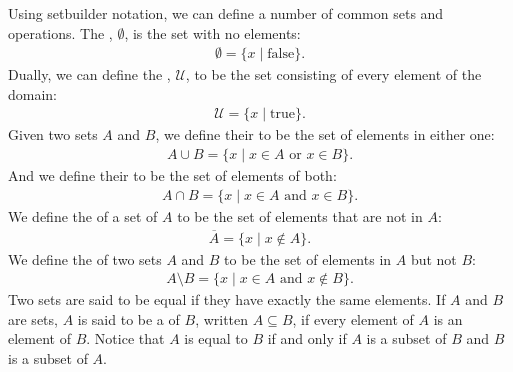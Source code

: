 \documentclass[letterpaper,10pt,english]{sphinxmanual}
\begin{document}
\sphinxAtStartPar
Using set\sphinxhyphen{}builder notation, we can define a number of common sets and operations. The , \(\emptyset\), is the set with no elements:
\begin{equation*}
\begin{split}\emptyset = \{ x \mid \mbox{false} \}.\end{split}
\end{equation*}
\sphinxAtStartPar
Dually, we can define the , \(\mathcal U\), to be the set consisting of every element of the domain:
\begin{equation*}
\begin{split}\mathcal U = \{ x \mid \mbox{true} \}.\end{split}
\end{equation*}
\sphinxAtStartPar
Given two sets \(A\) and \(B\), we define their  to be the set of elements in either one:
\begin{equation*}
\begin{split}A \cup B = \{ x \mid \mbox{$x \in A$ or $x \in B$} \}.\end{split}
\end{equation*}
\sphinxAtStartPar
And we define their  to be the set of elements of both:
\begin{equation*}
\begin{split}A \cap B = \{ x \mid \mbox{$x \in A$ and $x \in B$} \}.\end{split}
\end{equation*}
\sphinxAtStartPar
We define the  of a set of \(A\) to be the set of elements that are not in \(A\):
\begin{equation*}
\begin{split}\overline A = \{ x \mid \mbox{$x \notin A$} \}.\end{split}
\end{equation*}
\sphinxAtStartPar
We define the  of two sets \(A\) and \(B\) to be the set of elements in \(A\) but not \(B\):
\begin{equation*}
\begin{split}A \setminus B = \{ x \mid \mbox{$x \in A$ and $x \notin B$} \}.\end{split}
\end{equation*}
\sphinxAtStartPar
Two sets are said to be equal if they have exactly the same elements. If \(A\) and \(B\) are sets, \(A\) is said to be a  of \(B\), written \(A \subseteq B\), if every element of \(A\) is an element of \(B\). Notice that \(A\) is equal to \(B\) if and only if \(A\) is a subset of \(B\) and \(B\) is a subset of \(A\).
\end{document}
